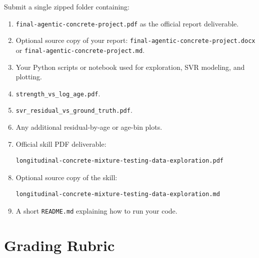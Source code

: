 \documentclass[12pt]{article}
\newcommand{\deliverable}[1]{\nolinkurl{#1}}
\begin{document}
Submit a single zipped folder containing:

\begin{enumerate}[label=\arabic*.]
  \item \deliverable{final-agentic-concrete-project.pdf} as the official report deliverable.
  \item Optional source copy of your report: \deliverable{final-agentic-concrete-project.docx} or \deliverable{final-agentic-concrete-project.md}.
  \item Your Python scripts or notebook used for exploration, SVR modeling, and plotting.
  \item \deliverable{strength_vs_log_age.pdf}.
  \item \deliverable{svr_residual_vs_ground_truth.pdf}.
  \item Any additional residual-by-age or age-bin plots.
  \item Official skill PDF deliverable:
\begin{lstlisting}[style=term]
longitudinal-concrete-mixture-testing-data-exploration.pdf
\end{lstlisting}
  \item Optional source copy of the skill:
\begin{lstlisting}[style=term]
longitudinal-concrete-mixture-testing-data-exploration.md
\end{lstlisting}
  \item A short \deliverable{README.md} explaining how to run your code.
\end{enumerate}

\section{Grading Rubric}
\end{document}
